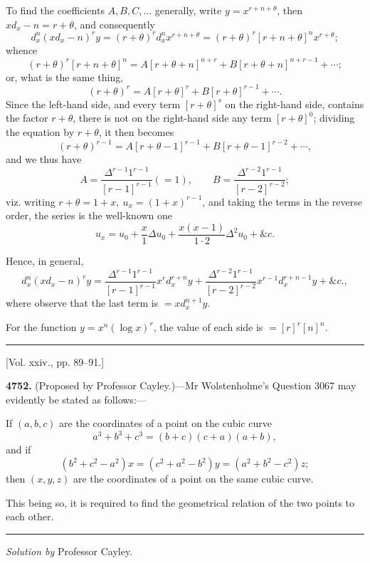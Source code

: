 \documentclass[10pt,twoside]{article}
\begin{document}
To find the coefficients \(A,B,C,\ldots\) generally, write
\(y=x^{r+n+\theta}\), then \(xd_x-n=r+\theta\), and consequently
\[
d_x^n(xd_x-n)^ry=(r+\theta)^r d_x^n x^{r+n+\theta}
  =(r+\theta)^r[r+n+\theta]^n x^{r+\theta};
\]
whence
\[
(r+\theta)^r[r+n+\theta]^n
 =A[r+\theta+n]^{n+r}+B[r+\theta+n]^{n+r-1}+\cdots;
\]
or, what is the same thing,
\[
        (r+\theta)^r=A[r+\theta]^r+B[r+\theta]^{r-1}+\cdots.
\]
Since the left-hand side, and every term \([r+\theta]^s\) on the right-hand
side, contains the factor \(r+\theta\), there is not on the right-hand side any
term \([r+\theta]^0\); dividing the equation by \(r+\theta\), it then becomes
\[
        (r+\theta)^{r-1}
        =A[r+\theta-1]^{r-1}+B[r+\theta-1]^{r-2}+\cdots,
\]
and we thus have
\[
A=\frac{\Delta^{r-1}1^{r-1}}{[r-1]^{r-1}}(=1),\qquad
B=\frac{\Delta^{r-2}1^{r-1}}{[r-2]^{r-2}};
\]
viz. writing \(r+\theta=1+x,\ u_x=(1+x)^{r-1}\), and taking the terms in the
reverse order, the series is the well-known one
\[
        u_x=u_0+\frac{x}{1}\Delta u_0+
        \frac{x(x-1)}{1\cdot2}\Delta^2u_0+\&c.
\]

\newpage

Hence, in general,
\[
d_x^n(xd_x-n)^r y
=\frac{\Delta^{r-1}1^{r-1}}{[r-1]^{r-1}}x^r d_x^{r+n}y
 +\frac{\Delta^{r-2}1^{r-1}}{[r-2]^{r-2}}x^{r-1}d_x^{r+n-1}y+\&c.,
\]
where observe that the last term is \(=xd_x^{n+1}y\).

For the function \(y=x^n(\log x)^r\), the value of each side is
\(=[r]^r[n]^n\).

\begin{center}
\rule{0.32\linewidth}{0.4pt}

[Vol. xxiv., pp. 89--91.]
\end{center}

\noindent\textbf{4752.} (Proposed by Professor Cayley.)---Mr Wolstenholme's
Question 3067 may evidently be stated as follows:---

If \((a,b,c)\) are the coordinates of a point on the cubic curve
\[
        a^3+b^3+c^3=(b+c)(c+a)(a+b),
\]
and if
\[
        (b^2+c^2-a^2)x=(c^2+a^2-b^2)y=(a^2+b^2-c^2)z;
\]
then \((x,y,z)\) are the coordinates of a point on the same cubic curve.

This being so, it is required to find the geometrical relation of the two
points to each other.

\begin{center}
\rule{0.25\linewidth}{0.4pt}

\textit{Solution by} Professor Cayley.
\end{center}
\end{document}
